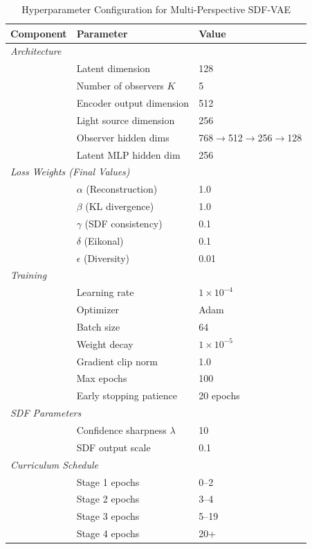 \documentclass[10pt,twocolumn,letterpaper]{article}
\newcommand{\toprule}{\hline\hline}
\newcommand{\midrule}{\hline}
\newcommand{\bottomrule}{\hline\hline}
\begin{document}
\begin{table}[h]
\centering
\caption{Hyperparameter Configuration for Multi-Perspective SDF-VAE}
\label{tab:hyperparams}
\small
\begin{tabular}{lll}
\toprule
\textbf{Component} & \textbf{Parameter} & \textbf{Value} \\
\midrule
\multicolumn{3}{l}{\textit{Architecture}} \\
& Latent dimension & 128 \\
& Number of observers $K$ & 5 \\
& Encoder output dimension & 512 \\
& Light source dimension & 256 \\
& Observer hidden dims & 768$\to$512$\to$256$\to$128 \\
& Latent MLP hidden dim & 256 \\
\midrule
\multicolumn{3}{l}{\textit{Loss Weights (Final Values)}} \\
& $\alpha$ (Reconstruction) & 1.0 \\
& $\beta$ (KL divergence) & 1.0 \\
& $\gamma$ (SDF consistency) & 0.1 \\
& $\delta$ (Eikonal) & 0.1 \\
& $\epsilon$ (Diversity) & 0.01 \\
\midrule
\multicolumn{3}{l}{\textit{Training}} \\
& Learning rate & $1 \times 10^{-4}$ \\
& Optimizer & Adam \\
& Batch size & 64 \\
& Weight decay & $1 \times 10^{-5}$ \\
& Gradient clip norm & 1.0 \\
& Max epochs & 100 \\
& Early stopping patience & 20 epochs \\
\midrule
\multicolumn{3}{l}{\textit{SDF Parameters}} \\
& Confidence sharpness $\lambda$ & 10 \\
& SDF output scale & 0.1 \\
\midrule
\multicolumn{3}{l}{\textit{Curriculum Schedule}} \\
& Stage 1 epochs & 0--2 \\
& Stage 2 epochs & 3--4 \\
& Stage 3 epochs & 5--19 \\
& Stage 4 epochs & 20+ \\
\bottomrule
\end{tabular}
\end{table}
\end{document}
